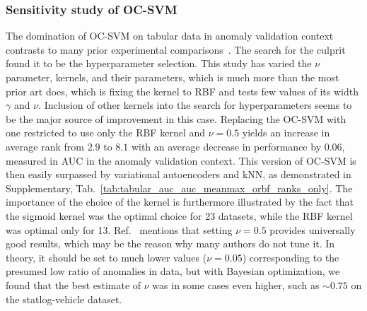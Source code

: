 \subsubsection{Sensitivity study of OC-SVM}
\label{sub:OC-SVM}
The domination of OC-SVM on tabular data in anomaly validation context contrasts to many prior experimental comparisons~\cite{goldstein2016comparative, chalapathyGroupAnomalyDetection2018, deecke2018image, gopalanPIDForestAnomalyDetection2019, iwataSupervisedAnomalyDetection2019, wang2020advae}. The search for the culprit found it to be the hyperparameter selection. This study has varied the $\nu$ parameter, kernels, and their parameters, which is much more than the most prior art does, which is fixing the kernel to RBF and tests few values of its width $\gamma$ and $\nu.$ Inclusion of other kernels into the search for hyperparameters seems to be the major source of improvement in this case. Replacing the OC-SVM with one restricted to use only the RBF kernel and $\nu=0.5$ yields an increase in average rank from $2.9$ to $8.1$ with an average decrease in performance by $0.06$, measured in AUC in the anomaly validation context. This version of OC-SVM is then easily surpassed by variational autoencoders and kNN, as demonstrated in Supplementary, Tab.~\ref{tab:tabular_auc_auc_meanmax_orbf_ranks_only}.  The importance of the choice of the kernel is furthermore illustrated by the fact that the sigmoid kernel was the optimal choice for 23 datasets, while the RBF kernel was optimal only for 13. Ref.~\cite{goldstein2016comparative} mentions that setting $\nu=0.5$ provides universally good results, which may be the reason why many authors do not tune it. In theory, it should be set to much lower values ($\nu = 0.05$) corresponding to the presumed low ratio of anomalies in data, but with Bayesian optimization, we found that the best estimate of $\nu$ was in some cases even higher, such as $\sim0.75$ on the statlog-vehicle dataset.

